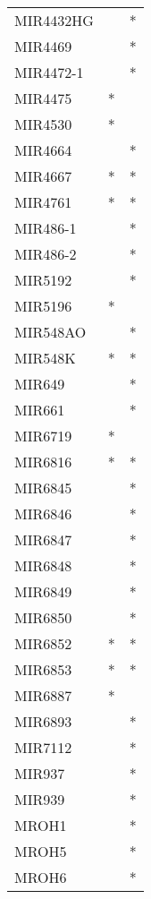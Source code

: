 \begin{longtable}{lcc}
MIR4432HG    &           &       * \\
MIR4469      &           &       * \\
MIR4472-1    &           &       * \\
MIR4475      &         * &         \\
MIR4530      &         * &         \\
MIR4664      &           &       * \\
MIR4667      &         * &       * \\
MIR4761      &         * &       * \\
MIR486-1     &           &       * \\
MIR486-2     &           &       * \\
MIR5192      &           &       * \\
MIR5196      &         * &         \\
MIR548AO     &           &       * \\
MIR548K      &         * &       * \\
MIR649       &           &       * \\
MIR661       &           &       * \\
MIR6719      &         * &         \\
MIR6816      &         * &       * \\
MIR6845      &           &       * \\
MIR6846      &           &       * \\
MIR6847      &           &       * \\
MIR6848      &           &       * \\
MIR6849      &           &       * \\
MIR6850      &           &       * \\
MIR6852      &         * &       * \\
MIR6853      &         * &       * \\
MIR6887      &         * &         \\
MIR6893      &           &       * \\
MIR7112      &           &       * \\
MIR937       &           &       * \\
MIR939       &           &       * \\
MROH1        &           &       * \\
MROH5        &           &       * \\
MROH6        &           &       * \\

\end{longtable}
